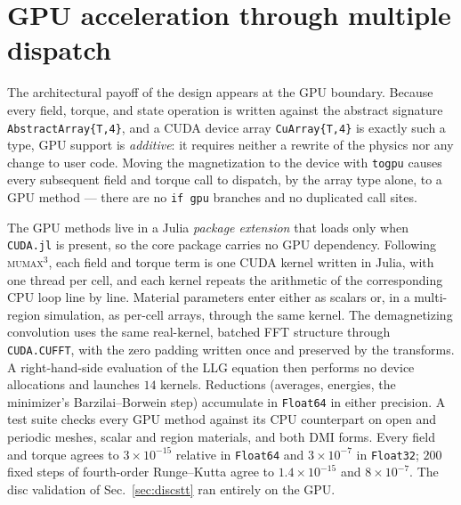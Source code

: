 \documentclass{article}      %
\newcommand{\mumax}{\textsc{mumax}$^3$}
\begin{document}
\section{GPU acceleration through multiple dispatch}
\label{sec:gpu}

The architectural payoff of the design appears at the GPU boundary. Because every
field, torque, and state operation is written against the abstract signature
\texttt{AbstractArray\{T,4\}}, and a CUDA device array \texttt{CuArray\{T,4\}} is
exactly such a type, GPU support is \emph{additive}: it requires neither a
rewrite of the physics nor any change to user code. Moving the magnetization to
the device with \texttt{togpu} causes every subsequent field and torque call to
dispatch, by the array type alone, to a GPU method --- there are no \texttt{if
gpu} branches and no duplicated call sites.

The GPU methods live in a Julia \emph{package extension} that loads only when
\texttt{CUDA.jl} is present, so the core package carries no GPU dependency.
Following \mumax{}, each field and torque term is one CUDA kernel written in
Julia, with one thread per cell, and each kernel repeats the arithmetic of the
corresponding CPU loop line by line. Material parameters enter either as scalars
or, in a multi-region simulation, as per-cell arrays, through the same kernel. The
demagnetizing convolution uses the same real-kernel, batched FFT structure through
\texttt{CUDA.CUFFT}, with the zero padding written once and preserved by the
transforms. A right-hand-side evaluation of the LLG equation then performs no
device allocations and launches $14$ kernels. Reductions (averages,
energies, the minimizer's Barzilai--Borwein step) accumulate in \texttt{Float64}
in either precision. A test suite checks every GPU method against its CPU
counterpart on open and periodic meshes, scalar and region materials, and both DMI
forms. Every field and torque agrees to $3\times10^{-15}$ relative in
\texttt{Float64} and $3\times10^{-7}$ in \texttt{Float32}; $200$ fixed steps of
fourth-order Runge--Kutta agree to $1.4\times10^{-15}$ and $8\times10^{-7}$. The disc validation of Sec.~\ref{sec:discstt} ran entirely on
the GPU.
\end{document}

